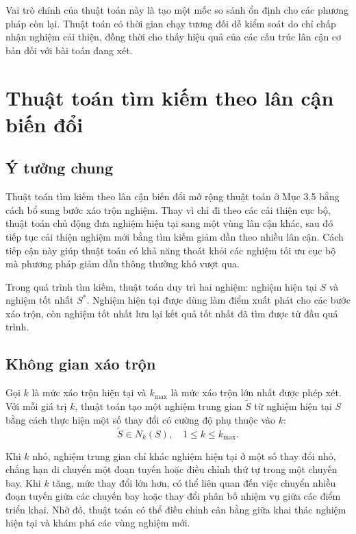 Vai trò chính của thuật toán này là tạo một mốc so sánh ổn định cho các phương pháp còn lại. Thuật toán có thời gian chạy tương đối dễ kiểm soát do chỉ chấp nhận nghiệm cải thiện, đồng thời cho thấy hiệu quả của các cấu trúc lân cận cơ bản đối với bài toán đang xét.

\section{Thuật toán tìm kiếm theo lân cận biến đổi}

\subsection{Ý tưởng chung}

Thuật toán tìm kiếm theo lân cận biến đổi mở rộng thuật toán ở Mục 3.5 bằng cách bổ sung bước xáo trộn nghiệm. Thay vì chỉ đi theo các cải thiện cục bộ, thuật toán chủ động đưa nghiệm hiện tại sang một vùng lân cận khác, sau đó tiếp tục cải thiện nghiệm mới bằng tìm kiếm giảm dần theo nhiều lân cận. Cách tiếp cận này giúp thuật toán có khả năng thoát khỏi các nghiệm tối ưu cục bộ mà phương pháp giảm dần thông thường khó vượt qua.

Trong quá trình tìm kiếm, thuật toán duy trì hai nghiệm: nghiệm hiện tại $S$ và nghiệm tốt nhất $S^*$. Nghiệm hiện tại được dùng làm điểm xuất phát cho các bước xáo trộn, còn nghiệm tốt nhất lưu lại kết quả tốt nhất đã tìm được từ đầu quá trình.

\subsection{Không gian xáo trộn}

Gọi $k$ là mức xáo trộn hiện tại và $k_{\max}$ là mức xáo trộn lớn nhất được phép xét. Với mỗi giá trị $k$, thuật toán tạo một nghiệm trung gian $\widetilde{S}$ từ nghiệm hiện tại $S$ bằng cách thực hiện một số thay đổi có cường độ phụ thuộc vào $k$:
\begin{equation}
    \widetilde{S} \in N_k(S), \quad 1 \leq k \leq k_{\max}.
    \label{eq:chapter3-vns-shaking}
\end{equation}

Khi $k$ nhỏ, nghiệm trung gian chỉ khác nghiệm hiện tại ở một số thay đổi nhỏ, chẳng hạn di chuyển một đoạn tuyến hoặc điều chỉnh thứ tự trong một chuyến bay. Khi $k$ tăng, mức thay đổi lớn hơn, có thể liên quan đến việc chuyển nhiều đoạn tuyến giữa các chuyến bay hoặc thay đổi phân bố nhiệm vụ giữa các điểm triển khai. Nhờ đó, thuật toán có thể điều chỉnh cân bằng giữa khai thác nghiệm hiện tại và khám phá các vùng nghiệm mới.

